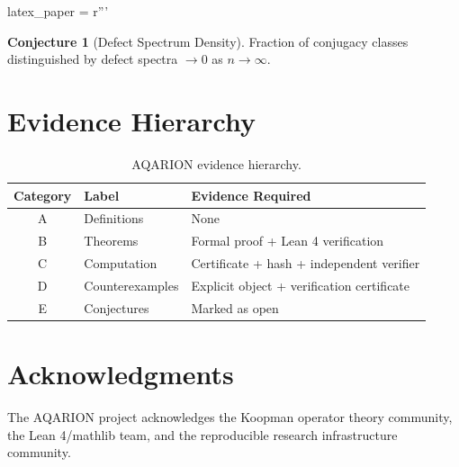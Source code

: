 latex_paper = r'''\documentclass[11pt,a4paper]{article}
\theoremstyle{definition}
\newtheorem{conjecture}{Conjecture}[section]
\begin{document}
\begin{conjecture}[Defect Spectrum Density]
Fraction of conjugacy classes distinguished by defect spectra $\to 0$ as $n \to \infty$.
\end{conjecture}

\section{Evidence Hierarchy}

\begin{table}[h]
\centering
\begin{tabular}{clp{8cm}}
\toprule
Category & Label & Evidence Required \\
\midrule
A & Definitions & None \\
B & Theorems & Formal proof + Lean 4 verification \\
C & Computation & Certificate + hash + independent verifier \\
D & Counterexamples & Explicit object + verification certificate \\
E & Conjectures & Marked as open \\
\bottomrule
\end{tabular}
\caption{AQARION evidence hierarchy.}
\end{table}

\section*{Acknowledgments}

The AQARION project acknowledges the Koopman operator theory community, the Lean 4/mathlib team, and the reproducible research infrastructure community.
\end{document}
